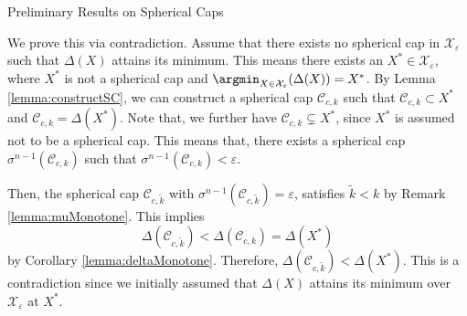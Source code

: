 \begin{section}{Preliminary Results on Spherical Caps}
\begin{pf}
We prove this via contradiction. Assume that there exists no spherical cap in $\mathcal{X}_{\varepsilon}$ such that $\Delta(X)$ attains its minimum. This means there exists an $X^* \in \mathcal{X}_{\varepsilon}$, where $X^*$ is not a spherical cap and $\argmin_{X \in \mathcal{X}_{\varepsilon}}(\Delta(X))=X^*$. By Lemma \ref{lemma:constructSC}, we can construct a spherical cap $\mathcal{C}_{c,k}$ such that $\mathcal{C}_{c,k} \subset X^*$ and $\mathcal{C}_{c,k} = \Delta(X^*)$. Note that, we further have $\mathcal{C}_{c,k} \subsetneq X^*$, since $X^*$ is assumed not to be a spherical cap. This means that, there exists a spherical cap $\sigma^{n-1}(\mathcal{C}_{c,k})$ such that $\sigma^{n-1}(\mathcal{C}_{c,k}) < \varepsilon$. 

Then, the spherical cap $\mathcal{C}_{c, \tilde{k}}$ with $\sigma^{n-1}(\mathcal{C}_{c, \tilde{k}}) = \varepsilon$, satisfies $\tilde{k} < k$ by Remark \ref{lemma:muMonotone}. This implies $$\Delta(\mathcal{C}_{c, \tilde{k}}) < \Delta(\mathcal{C}_{c, k}) = \Delta(X^*)$$ by Corollary \ref{lemma:deltaMonotone}. Therefore, $\Delta(\mathcal{C}_{c, \tilde{k}}) < \Delta(X^*)$. This is a contradiction since we initially assumed that $\Delta(X)$ attains its minimum over $\mathcal{X}_{\varepsilon}$ at $X^*$.
\end{pf}
\end{section}

